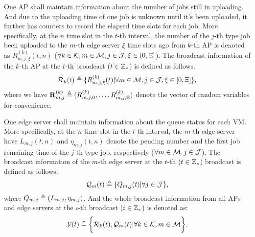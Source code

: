 One AP shall maintain information about the number of jobs still in uploading. 
And due to the uploading time of one job is unknown until it's been uploaded, it further has counters to record the elapsed time slots for each job.
More specifically, at the $n$ time slot in the $t$-th interval, the number of the $j$-th type job been uploaded to the $m$-th edge server $\xi$ time slots ago from $k$-th AP is denoted as $R^{(k)}_{m,j,\xi}({t,n})$ ($\forall k\in\mathcal{K}, m\in\mathcal{M}, j\in\mathcal{J}, \xi\in(0,\Xi]$).
The broadcast information of the $k$-th AP at the $t$-th broadcast ($t\in\mathbb{Z}_{*}$) is defined as follows.
\begin{align}
    \mathcal{R}_{k}({t}) \triangleq \{R^{(k)}_{m,j,\xi}({t}) | \forall m\in\mathcal{M}, j\in\mathcal{J}, \xi \in [0,\Xi]\},
\end{align}
where we have $\mathbf{R}^{(k)}_{m,j} \triangleq ( R^{(k)}_{m,j,0},\dots,R^{(k)}_{m,j,\Xi} )$ denote the vector of random variables for convenience.

One edge server shall maintain information about the queue status for each VM.
More specifically, at the $n$ time slot in the $t$-th interval, the $m$-th edge server have $L_{m,j}({t,n})$ and $\eta_{m,j}({t,n})$ denote the pending number and the first job remaining time of the $j$-th type job, respectively ($\forall m\in\mathcal{M}, j\in\mathcal{J}$).
The broadcast information of the $m$-th edge server at the $t$-th ($t\in\mathbb{Z}_{*}$) broadcast is defined as follows.
\begin{align}
    \mathcal{Q}_{m}({t}) \triangleq \{Q_{m,j}({t}) | \forall j\in\mathcal{J}\},
\end{align}
where $Q_{m,j} \triangleq (L_{m,j}, \eta_{m,j})$.
And the whole broadcast information from all APs and edge servers at the $i$-th broadcast ($i\in\mathbb{Z}_{*}$) is denoted as:
\begin{align}
    \mathcal{Y}({t}) \triangleq
        \bigg\{
            \mathcal{R}_{k}({t}), \mathcal{Q}_{m}({t}) | \forall k\in\mathcal{K}, m\in\mathcal{M}
        \bigg\}.
\end{align}

